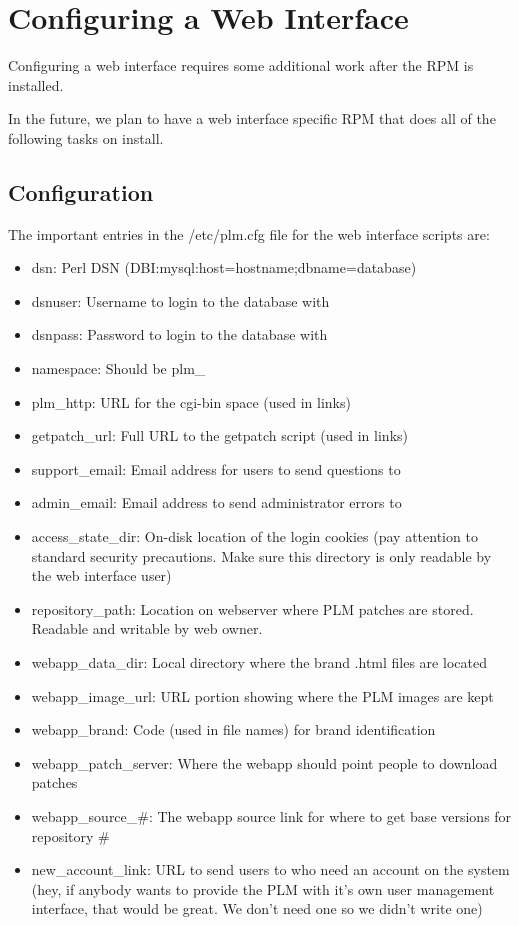 \section {Configuring a Web Interface}
Configuring a web interface requires some additional work after the RPM is installed.

In the future, we plan to have a web interface specific RPM that does all of
the following tasks on install.

\subsection{Configuration}
The important entries in the /etc/plm.cfg file for the web interface scripts are:

\begin{itemize}
\item dsn: Perl DSN (DBI:mysql:host=hostname;dbname=database)
\item dsnuser: Username to login to the database with
\item dsnpass: Password to login to the database with
\item namespace: Should be plm\_
\item plm\_http: URL for the cgi-bin space (used in links)
\item getpatch\_url: Full URL to the getpatch script (used in links)
\item support\_email: Email address for users to send questions to
\item admin\_email: Email address to send administrator errors to
\item access\_state\_dir: On-disk location of the login cookies (pay attention to standard security precautions.  Make sure this directory is only readable by the web interface user)
\item repository\_path: Location on webserver where PLM patches are stored. Readable and writable by web owner.
\item webapp\_data\_dir: Local directory where the brand .html files are located
\item webapp\_image\_url: URL portion showing where the PLM images are kept
\item webapp\_brand: Code (used in file names) for brand identification
\item webapp\_patch\_server: Where the webapp should point people to download patches
\item webapp\_source\_\#: The webapp source link for where to get base versions for repository \# 
\item new\_account\_link: URL to send users to who need an account on the system (hey, if anybody wants to provide the PLM with it's own user management interface, that would be great.  We don't need one so we didn't write one)
\end{itemize}


